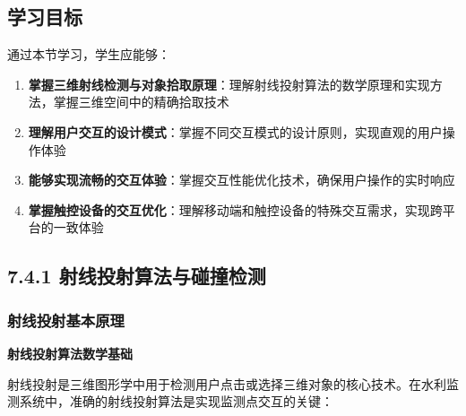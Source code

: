 \subsection{学习目标}\label{ux5b66ux4e60ux76eeux6807-4}

通过本节学习，学生应能够：

\begin{enumerate}
\def\labelenumi{\arabic{enumi}.}
\tightlist
\item
  \textbf{掌握三维射线检测与对象拾取原理}：理解射线投射算法的数学原理和实现方法，掌握三维空间中的精确拾取技术
\item
  \textbf{理解用户交互的设计模式}：掌握不同交互模式的设计原则，实现直观的用户操作体验
\item
  \textbf{能够实现流畅的交互体验}：掌握交互性能优化技术，确保用户操作的实时响应
\item
  \textbf{掌握触控设备的交互优化}：理解移动端和触控设备的特殊交互需求，实现跨平台的一致体验
\end{enumerate}

\subsection{7.4.1 射线投射算法与碰撞检测}\label{ux5c04ux7ebfux6295ux5c04ux7b97ux6cd5ux4e0eux78b0ux649eux68c0ux6d4b}

\subsubsection{射线投射基本原理}\label{ux5c04ux7ebfux6295ux5c04ux57faux672cux539fux7406}

\textbf{射线投射算法数学基础}

射线投射是三维图形学中用于检测用户点击或选择三维对象的核心技术。在水利监测系统中，准确的射线投射算法是实现监测点交互的关键：

